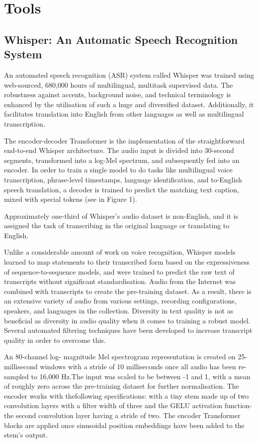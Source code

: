 \documentclass[conference]{IEEEtran}
\begin{document}
\section{Tools}

\subsection{Whisper: An Automatic Speech Recognition System}

\quad \quad An automated speech recognition (ASR) system called Whisper was trained using web-sourced, 680,000 hours of multilingual, multitask supervised data. The robustness against accents, background noise, and technical terminology is enhanced by the utilisation of such a huge and diversified dataset. Additionally, it facilitates translation into English from other languages as well as multilingual transcription.

The encoder-decoder Transformer is the implementation of the straightforward end-to-end Whisper architecture. The audio input is divided into 30-second segments, transformed into a log-Mel spectrum, and subsequently fed into an encoder. In order to train a single model to do tasks like multilingual voice transcription, phrase-level timestamps, language identification, and to-English speech translation, a decoder is trained to predict the matching text caption, mixed with special tokens (see in Figure 1).

Approximately one-third of Whisper's audio dataset is non-English, and it is assigned the task of transcribing in the original language or translating to English.

Unlike a considerable amount of work on voice recognition, Whisper models learned to map statements to their transcribed form based on the expressiveness of sequence-to-sequence models, and were trained to predict the raw text of transcripts without significant standardisation. Audio from the Internet was combined with transcripts to create the pre-training dataset. As a result, there is an extensive variety of audio from various settings, recording configurations, speakers, and languages in the collection. Diversity in text quality is not as beneficial as diversity in audio quality when it comes to training a robust model. Several automated filtering techniques have been developed to increase transcript quality in order to overcome this.

An 80-channel log- magnitude Mel spectrogram representation is created on 25-millisecond windows with a stride of 10 milliseconds once all audio has been re-sampled to 16,000 Hz.The input was scaled to be between -1 and 1, with a mean of roughly zero across the pre-training dataset for further  normalisation. The encoder works with thefollowing specifications: with a tiny stem made up of two convolution layers with a filter width of three and the GELU activation function-the second convolution layer having a stride of two. The encoder Transformer blocks are applied once sinusoidal position embeddings have been added to the stem's output.
\end{document}

